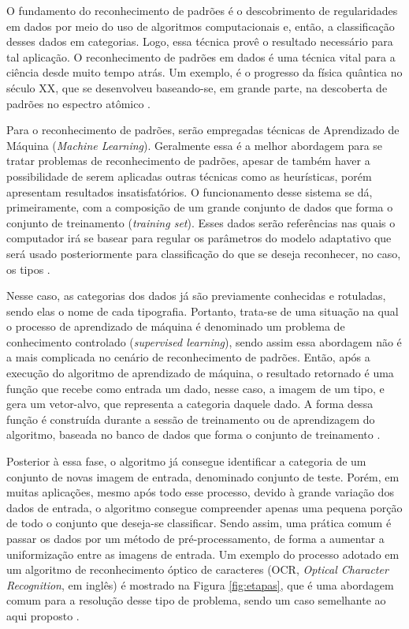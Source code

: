 O fundamento do reconhecimento de padrões é o descobrimento de regularidades em dados por meio do uso de algoritmos computacionais e, então, a classificação desses dados em categorias. Logo, essa técnica provê o resultado necessário para tal aplicação. O reconhecimento de padrões em dados é uma técnica vital para a ciência desde muito tempo atrás. Um exemplo, é o progresso da física quântica no século XX, que se desenvolveu baseando-se, em grande parte, na descoberta de padrões no espectro atômico .

Para o reconhecimento de padrões, serão empregadas técnicas de Aprendizado de Máquina (\textit{Machine Learning}). Geralmente essa é a melhor abordagem para se tratar problemas de reconhecimento de padrões, apesar de também haver a possibilidade de serem aplicadas outras técnicas como as heurísticas, porém apresentam resultados insatisfatórios. O funcionamento desse sistema se dá, primeiramente, com a composição de um grande conjunto de dados que forma o conjunto de treinamento (\textit{training set}). Esses dados serão referências nas quais o computador irá se basear para regular os parâmetros do modelo adaptativo que será usado posteriormente para classificação do que se deseja reconhecer, no caso, os tipos .


Nesse caso, as categorias dos dados já são previamente conhecidas e rotuladas, sendo elas o nome de cada tipografia. Portanto, trata-se de uma situação na qual o processo de aprendizado de máquina é denominado um problema de conhecimento controlado (\textit{supervised learning}), sendo assim essa abordagem não é a mais complicada no cenário de reconhecimento de padrões. Então, após a execução do algoritmo de aprendizado de máquina, o resultado retornado é uma função que recebe como entrada um dado, nesse caso, a imagem de um tipo, e gera um vetor-alvo, que representa a categoria daquele dado. A forma dessa função é construída durante a sessão de treinamento ou de aprendizagem do algoritmo, baseada no banco de dados que forma o conjunto de treinamento .

Posterior à essa fase, o algoritmo já consegue identificar a categoria de um conjunto de novas imagem de entrada, denominado conjunto de teste. Porém, em muitas aplicações, mesmo após todo esse processo, devido à grande variação dos dados de entrada, o algoritmo consegue compreender apenas uma pequena porção de todo o conjunto que deseja-se classificar. Sendo assim, uma prática comum é passar os dados por um método de pré-processamento, de forma a aumentar a uniformização entre as imagens de entrada. Um exemplo do processo adotado em um algoritmo de reconhecimento óptico de caracteres (OCR, \textit{Optical Character Recognition}, em inglês) é mostrado na Figura \ref{fig:etapas}, que é uma abordagem comum para a resolução desse tipo de problema, sendo um caso semelhante ao aqui proposto  .

